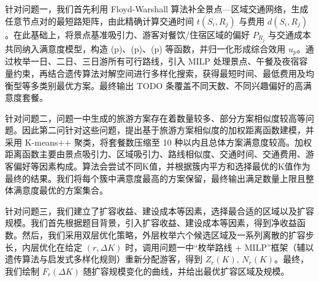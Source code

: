 \begin{cabstract}	%
\vspace*{-2\baselineskip}   %
\begin{center}
  \\[0.8em]
\end{center}

\begin{center}
  \\[0.8em]
\end{center}

针对问题一，我们首先利用 Floyd-Warshall 算法补全景点—区域交通网络，生成任意节点对的最短路矩阵，由此精确计算交通时间 \(t(S_i,R_j)\) 与费用 \(d(S_i,R_j)\)。在此基础上，将景点基准吸引力、游客对餐饮/住宿区域的偏好 \(P_{R_j}\) 与交通成本共同纳入满意度模型，构造 (p)、(p)、(p) 等函数，并归一化形成综合效用 \(u_p\)。通过枚举一日、二日、三日游所有可行路线，引入 MILP 处理景点、午餐及夜宿容量约束，再结合遗传算法对解空间进行多样化搜索，获得最短时间、最低费用及均衡型等多类别最优方案。最终输出 TODO 条覆盖不同天数、不同兴趣偏好的高满意度套餐。

针对问题二，问题一中生成的旅游方案存在着数量较多、部分方案相似度较高等问题。因此第二问针对这些问题，提出基于旅游方案相似度的加权距离函数建模，并采用 K-means++ 聚类，将套餐数压缩至 10 种以内且总体方案满意度较高。加权距离函数主要由景点吸引力、区域吸引力、路线相似度、交通时间、交通费用、游客偏好等因素构成。算法会尝试不同K值，并根据簇内平方和选择最优的K值作为最终的结果。我们将每个簇中满意度最高的方案保留，最终输出满足数量上限且整体满意度最优的方案集合。

针对问题三，我们建立了扩容收益、建设成本等因素，选择最合适的区域以及扩容规模。我们首先根据题目背景，引入扩容收益、建设成本等因素，得到净收益函数。然后，我们采用双层优化策略，外层枚举六个候选区域及一系列离散的扩容步长，内层优化在给定 $(r,\Delta K)$ 时，调用问题一中“枚举路线 + MILP”框架（辅以遗传算法与启发式多样化规则）重新分配游客，得到 $Z_r(K),\,N_r(K)$。最终，我们绘制 $F_r(\Delta K)$ 随扩容规模变化的曲线，并给出最优扩容区域及规模。
\end{cabstract}

